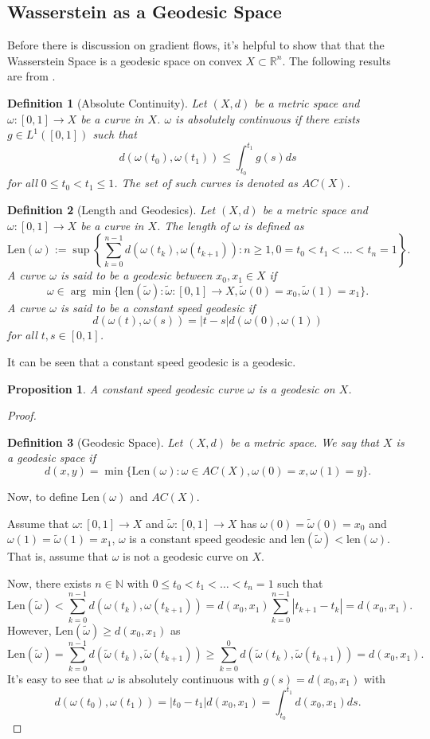 \documentclass[12pt]{article}
\newcommand{\R}{\mathbb{R}}
\newcommand{\N}{\mathbb{N}}
\theoremstyle{plain}
\newtheorem{prop}{Proposition}[section]
\newtheorem{defn}{Definition}[section]
\numberwithin{equation}{section}
\begin{document}
\subsection{Wasserstein as a Geodesic Space}
Before there is discussion on gradient flows, it's helpful to show that that the Wasserstein Space is a geodesic space on convex $X\subset \R^n$. The following results are from \cite{santambrogio}.
\begin{defn}[Absolute Continuity]
  Let $(X,d)$ be a metric space and $\omega : [0,1]\to X$ be a curve in $X$. $\omega$ is absolutely continuous if there exists $g\in L^1([0,1])$ such that 
  \[d(\omega(t_0),\omega(t_1)) \le \int_{t_0}^{t_1} g(s)ds\]
  for all $0\le t_0 < t_1 \le 1$. The set of such curves is denoted as $AC(X)$.
\end{defn}
\begin{defn}[Length and Geodesics]\label{defn:len}
  Let $(X,d)$ be a metric space and $\omega : [0,1]\to X$ be a curve in $X$. The length of $\omega$ is defined as 
  \[\text{Len}(\omega):= \sup\left\{\sum_{k=0}^{n-1}d(\omega(t_k),\omega(t_{k+1})) : n\ge 1, 0 = t_0 <t_1 < \dots < t_n = 1\right\}.\]
  A curve $\omega$ is said to be a geodesic between $x_0,x_1\in X$ if 
  \[\omega \in \arg\min\{\text{len}(\tilde{\omega}) : \tilde{\omega}:[0,1]\to X, \tilde{\omega}(0) = x_0, \tilde{\omega}(1) = x_1\}.\]
  A curve $\omega$ is said to be a constant speed geodesic if 
  \[d(\omega(t),\omega(s)) = |t-s|d(\omega(0),\omega(1))\]
  for all $t,s\in [0,1]$.
\end{defn}
It can be seen that a constant speed geodesic is a geodesic.
\begin{prop}
  A constant speed geodesic curve $\omega$ is a geodesic on $X$.
\end{prop}
\begin{proof}
\begin{defn}[Geodesic Space]
  Let $(X,d)$ be a metric space. We say that $X$ is a geodesic space if 
  \[d(x,y) = \min\{\text{Len}(\omega) : \omega\in AC(X),\omega(0) = x, \omega(1) = y\}.\]
\end{defn}
Now, to define $\text{Len}(\omega)$ and $AC(X)$.

  Assume that $\omega: [0,1]\to X$ and $\tilde{\omega}: [0,1]\to X$ has $\omega(0) = \tilde{\omega}(0) = x_0$ and $\omega(1)=\tilde{\omega}(1) = x_1$,
  $\omega$ is a constant speed geodesic and $\text{len}(\tilde{\omega}) < \text{len}(\omega)$. That is, assume that $\omega$ is not a geodesic curve on $X$.

  Now, there exists $n\in \N$ with $0 \le t_0 < t_1 < \dots < t_n = 1$ such that 
  \[\text{Len}(\tilde{\omega}) < \sum_{k=0}^{n-1}d(\omega(t_k),\omega(t_{k+1})) = d(x_0,x_1)\sum_{k=0}^{n-1}|t_{k+1}-t_k| = d(x_0,x_1).\]
  However, $\text{Len}(\tilde{\omega}) \ge d(x_0,x_1)$ as 
  \[\text{Len}(\tilde{\omega}) = \sum_{k=0}^{n-1}d(\tilde{\omega}(t_k),\tilde{\omega}(t_{k+1})) \ge \sum_{k=0}^{0}d(\tilde{\omega}(t_k),\tilde{\omega}(t_{k+1})) = d(x_0,x_1).\]
  It's easy to see that $\omega$ is absolutely continuous with $g(s) = d(x_0,x_1)$ with
  \[d(\omega(t_0),\omega(t_1)) = |t_0-t_1|d(x_0,x_1) = \int_{t_0}^{t_1}d(x_0,x_1)ds.\]
\end{proof}
\end{document}
